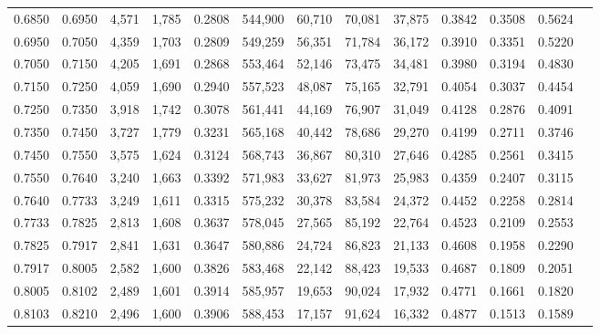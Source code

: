 \begin{tabular}{rrrrrrrrrrrrr}
0.6850 & 0.6950 &  4,571 & 1,785 &                                     0.2808 & 544,900 &  60,710 &  70,081 &  37,875 & 0.3842 & 0.3508 & 0.5624 \\
0.6950 & 0.7050 &  4,359 & 1,703 &                                     0.2809 & 549,259 &  56,351 &  71,784 &  36,172 & 0.3910 & 0.3351 & 0.5220 \\
0.7050 & 0.7150 &  4,205 & 1,691 &                                     0.2868 & 553,464 &  52,146 &  73,475 &  34,481 & 0.3980 & 0.3194 & 0.4830 \\
0.7150 & 0.7250 &  4,059 & 1,690 &                                     0.2940 & 557,523 &  48,087 &  75,165 &  32,791 & 0.4054 & 0.3037 & 0.4454 \\
0.7250 & 0.7350 &  3,918 & 1,742 &                                     0.3078 & 561,441 &  44,169 &  76,907 &  31,049 & 0.4128 & 0.2876 & 0.4091 \\
0.7350 & 0.7450 &  3,727 & 1,779 &                                     0.3231 & 565,168 &  40,442 &  78,686 &  29,270 & 0.4199 & 0.2711 & 0.3746 \\
0.7450 & 0.7550 &  3,575 & 1,624 &                                     0.3124 & 568,743 &  36,867 &  80,310 &  27,646 & 0.4285 & 0.2561 & 0.3415 \\
0.7550 & 0.7640 &  3,240 & 1,663 &                                     0.3392 & 571,983 &  33,627 &  81,973 &  25,983 & 0.4359 & 0.2407 & 0.3115 \\
0.7640 & 0.7733 &  3,249 & 1,611 &                                     0.3315 & 575,232 &  30,378 &  83,584 &  24,372 & 0.4452 & 0.2258 & 0.2814 \\
0.7733 & 0.7825 &  2,813 & 1,608 &                                     0.3637 & 578,045 &  27,565 &  85,192 &  22,764 & 0.4523 & 0.2109 & 0.2553 \\
0.7825 & 0.7917 &  2,841 & 1,631 &                                     0.3647 & 580,886 &  24,724 &  86,823 &  21,133 & 0.4608 & 0.1958 & 0.2290 \\
0.7917 & 0.8005 &  2,582 & 1,600 &                                     0.3826 & 583,468 &  22,142 &  88,423 &  19,533 & 0.4687 & 0.1809 & 0.2051 \\
0.8005 & 0.8102 &  2,489 & 1,601 &                                     0.3914 & 585,957 &  19,653 &  90,024 &  17,932 & 0.4771 & 0.1661 & 0.1820 \\
0.8103 & 0.8210 &  2,496 & 1,600 &                                     0.3906 & 588,453 &  17,157 &  91,624 &  16,332 & 0.4877 & 0.1513 & 0.1589 \\

\end{tabular}
